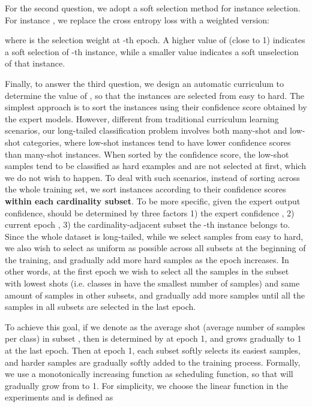 \documentclass[runningheads]{llncs}
\begin{document}
	
	For the second question, we adopt a soft selection method for instance selection. For instance , we replace the cross entropy loss with a weighted version:
	
	where  is the selection weight at -th epoch. A higher value of  (close to 1) indicates a soft selection of -th instance, while a smaller value indicates a soft unselection of that instance. 
	
	Finally, to answer the third question, we design an automatic curriculum to determine the value of , so that the instances are selected from easy to hard.
The simplest approach is to sort the instances using their confidence score  obtained by the expert models. However, different from traditional curriculum learning scenarios, our long-tailed classification problem involves both many-shot and low-shot categories, where low-shot instances tend to have lower confidence scores than many-shot instances. When sorted by the confidence score, the low-shot samples tend to be classified as hard examples and are not selected at first, which we do not wish to happen. To deal with such scenarios, instead of sorting across the whole training set, we sort instances according to their confidence scores \textbf{within each cardinality subset}. To be more specific, given the expert output confidence,  should be determined by three factors 1) the expert confidence , 2) current epoch ,  3) the cardinality-adjacent subset  the -th instance belongs to. Since the whole dataset is long-tailed, while we select samples from easy to hard, we also wish to select as uniform as possible across all subsets at the beginning of the training, and gradually add more hard samples as the epoch increases. In other words, at the first epoch we wish to select all the samples in the subset with lowest shots  (i.e. classes in  have the smallest number of samples) and same amount of samples in other subsets, and gradually add more samples until all the samples in all subsets are selected in the last epoch.
	
	To achieve this goal, if we denote  as the average shot (average number of samples per class) in subset , then  is determined by  at epoch 1, and grows gradually to 1 at the last epoch. Then at epoch 1, each subset softly selects its   easiest samples, and harder samples are gradually softly added to the training process. 
Formally, we use a monotonically increasing function  as scheduling function, so that  will gradually grow from  to 1. For simplicity, we choose the linear function in the experiments and  is defined as 
	
\end{document}
